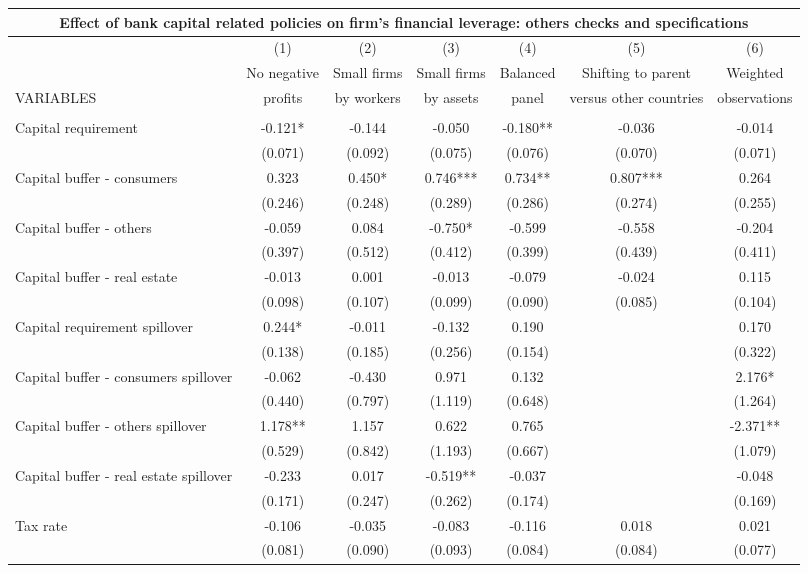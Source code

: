 \begin{tabular}{lcccccc}
\multicolumn{7}{c}{Effect of bank capital related policies on firm's financial leverage: others checks and specifications} \\ \hline
 & (1) & (2) & (3) & (4) & (5) & (6) \\
 & No negative & Small firms & Small firms & Balanced & Shifting to parent & Weighted \\
VARIABLES & profits & by workers & by assets & panel & versus other countries & observations \\ \hline
 &  &  &  &  &  &  \\
Capital requirement & -0.121* & -0.144 & -0.050 & -0.180** & -0.036 & -0.014 \\
 & (0.071) & (0.092) & (0.075) & (0.076) & (0.070) & (0.071) \\
Capital buffer - consumers & 0.323 & 0.450* & 0.746*** & 0.734** & 0.807*** & 0.264 \\
 & (0.246) & (0.248) & (0.289) & (0.286) & (0.274) & (0.255) \\
Capital buffer - others & -0.059 & 0.084 & -0.750* & -0.599 & -0.558 & -0.204 \\
 & (0.397) & (0.512) & (0.412) & (0.399) & (0.439) & (0.411) \\
Capital buffer - real estate & -0.013 & 0.001 & -0.013 & -0.079 & -0.024 & 0.115 \\
 & (0.098) & (0.107) & (0.099) & (0.090) & (0.085) & (0.104) \\
Capital requirement spillover & 0.244* & -0.011 & -0.132 & 0.190 &  & 0.170 \\
 & (0.138) & (0.185) & (0.256) & (0.154) &  & (0.322) \\
Capital buffer - consumers spillover & -0.062 & -0.430 & 0.971 & 0.132 &  & 2.176* \\
 & (0.440) & (0.797) & (1.119) & (0.648) &  & (1.264) \\
Capital buffer - others spillover & 1.178** & 1.157 & 0.622 & 0.765 &  & -2.371** \\
 & (0.529) & (0.842) & (1.193) & (0.667) &  & (1.079) \\
Capital buffer - real estate spillover & -0.233 & 0.017 & -0.519** & -0.037 &  & -0.048 \\
 & (0.171) & (0.247) & (0.262) & (0.174) &  & (0.169) \\
Tax rate & -0.106 & -0.035 & -0.083 & -0.116 & 0.018 & 0.021 \\
 & (0.081) & (0.090) & (0.093) & (0.084) & (0.084) & (0.077) \\

\end{tabular}
